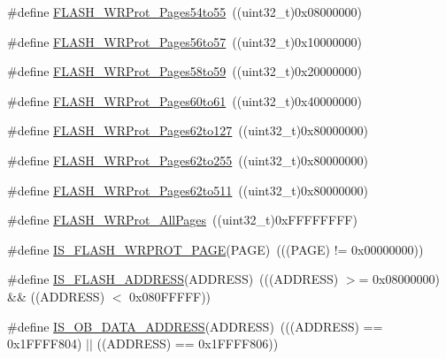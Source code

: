 \begin{DoxyCompactItemize}
\item 
\#define \hyperlink{group___option___bytes___write___protection_gacd4ea5e6cc3819f40a55a61f3075b626}{F\+L\+A\+S\+H\+\_\+\+W\+R\+Prot\+\_\+\+Pages54to55}~((uint32\+\_\+t)0x08000000)
\item 
\#define \hyperlink{group___option___bytes___write___protection_ga1779d1131ad245861c61dbf43a2d2d3d}{F\+L\+A\+S\+H\+\_\+\+W\+R\+Prot\+\_\+\+Pages56to57}~((uint32\+\_\+t)0x10000000)
\item 
\#define \hyperlink{group___option___bytes___write___protection_ga4a05bf4eec7521ae90ff662db2a9f4f5}{F\+L\+A\+S\+H\+\_\+\+W\+R\+Prot\+\_\+\+Pages58to59}~((uint32\+\_\+t)0x20000000)
\item 
\#define \hyperlink{group___option___bytes___write___protection_ga22f620be7f346efcb2cbb732b879fd0c}{F\+L\+A\+S\+H\+\_\+\+W\+R\+Prot\+\_\+\+Pages60to61}~((uint32\+\_\+t)0x40000000)
\item 
\#define \hyperlink{group___option___bytes___write___protection_ga346285408d8f738796fc22d710777ba9}{F\+L\+A\+S\+H\+\_\+\+W\+R\+Prot\+\_\+\+Pages62to127}~((uint32\+\_\+t)0x80000000)
\item 
\#define \hyperlink{group___option___bytes___write___protection_gacec4a825ff505ef5751ec6e5cf6d941e}{F\+L\+A\+S\+H\+\_\+\+W\+R\+Prot\+\_\+\+Pages62to255}~((uint32\+\_\+t)0x80000000)
\item 
\#define \hyperlink{group___option___bytes___write___protection_gab233da6081eaf5d664f16c0e8c7df138}{F\+L\+A\+S\+H\+\_\+\+W\+R\+Prot\+\_\+\+Pages62to511}~((uint32\+\_\+t)0x80000000)
\item 
\#define \hyperlink{group___option___bytes___write___protection_ga6fdaf38a559d606660dd10a411b77ea5}{F\+L\+A\+S\+H\+\_\+\+W\+R\+Prot\+\_\+\+All\+Pages}~((uint32\+\_\+t)0x\+F\+F\+F\+F\+F\+F\+F\+F)
\item 
\#define \hyperlink{group___option___bytes___write___protection_gafe68b93dfb1ebf68d74f871850ab373b}{I\+S\+\_\+\+F\+L\+A\+S\+H\+\_\+\+W\+R\+P\+R\+O\+T\+\_\+\+P\+A\+GE}(P\+A\+GE)~(((P\+A\+GE) != 0x00000000))
\item 
\#define \hyperlink{group___option___bytes___write___protection_gad0c8166ba15a0b8d458412a8bb74e2f0}{I\+S\+\_\+\+F\+L\+A\+S\+H\+\_\+\+A\+D\+D\+R\+E\+SS}(A\+D\+D\+R\+E\+SS)~(((A\+D\+D\+R\+E\+SS) $>$= 0x08000000) \&\& ((\+A\+D\+D\+R\+E\+S\+S) $<$ 0x080\+F\+F\+F\+F\+F))
\item 
\#define \hyperlink{group___option___bytes___write___protection_ga73fcac8d5f301a5c98518374ae926633}{I\+S\+\_\+\+O\+B\+\_\+\+D\+A\+T\+A\+\_\+\+A\+D\+D\+R\+E\+SS}(A\+D\+D\+R\+E\+SS)~(((A\+D\+D\+R\+E\+SS) == 0x1\+F\+F\+F\+F804) $\vert$$\vert$ ((\+A\+D\+D\+R\+E\+S\+S) == 0x1\+F\+F\+F\+F806))
\end{DoxyCompactItemize}


